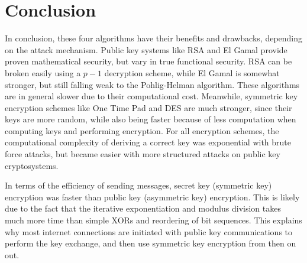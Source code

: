 \documentclass[12pt]{report}
\begin{document}
\section{Conclusion}
In conclusion, these four algorithms have their benefits and drawbacks, depending on the attack mechanism. Public key systems like RSA and El Gamal provide
proven mathematical security, but vary in true functional security. RSA can be broken easily using a $p-1$ decryption scheme, while El Gamal is somewhat stronger,
but still falling weak to the Pohlig-Helman algorithm. These algorithms are in general slower due to their computational cost. Meanwhile, symmetric key
encryption schemes like One Time Pad and DES are much stronger, since their keys are more random, while also being faster because of less computation when
computing keys and performing encryption. For all encryption schemes, the computational complexity of deriving a correct key was exponential with brute force
attacks, but became easier with more structured attacks on public key cryptosystems.

In terms of the efficiency of sending messages, secret key (symmetric key) encryption was faster than public key (asymmetric key) encryption. This is likely due to
the fact that the iterative exponentiation and modulus division takes much more time than simple XORs and reordering of bit sequences. This explains why most
internet connections are initiated with public key communications to perform the key exchange, and then use symmetric key encryption from then on out.

\newpage
\end{document}
